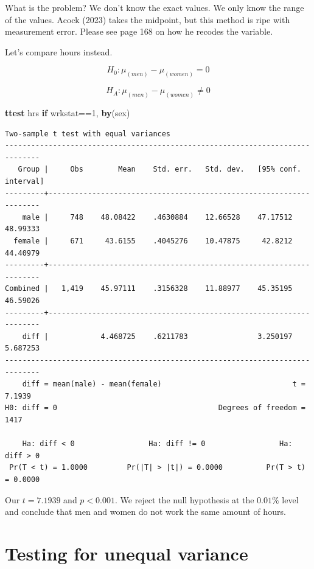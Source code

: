 \documentclass[
]{book}
\newenvironment{Shaded}{\begin{snugshade}}{\end{snugshade}}
\newcommand{\KeywordTok}[1]{\textcolor[rgb]{0.13,0.29,0.53}{\textbf{#1}}}
\newcommand{\NormalTok}[1]{#1}
\begin{document}
What is the problem? We don't know the exact values. We only know the range of the values. Acock (2023) takes the midpoint, but this method is ripe with measurement error. Please see page 168 on how he recodes the variable.

Let's compare hours instead.

\[ H_0: \mu_{(men)} - \mu_{(women)} = 0 \]

\[ H_A: \mu_{(men)} - \mu_{(women)} \neq 0 \]

\begin{Shaded}
\begin{Highlighting}[]
\KeywordTok{ttest}\NormalTok{ hrs }\KeywordTok{if}\NormalTok{ wrkstat==1, }\KeywordTok{by}\NormalTok{(sex)}
\end{Highlighting}
\end{Shaded}

\begin{verbatim}
Two-sample t test with equal variances
------------------------------------------------------------------------------
   Group |     Obs        Mean    Std. err.   Std. dev.   [95% conf. interval]
---------+--------------------------------------------------------------------
    male |     748    48.08422    .4630884    12.66528    47.17512    48.99333
  female |     671     43.6155    .4045276    10.47875     42.8212    44.40979
---------+--------------------------------------------------------------------
Combined |   1,419    45.97111    .3156328    11.88977    45.35195    46.59026
---------+--------------------------------------------------------------------
    diff |            4.468725    .6211783                3.250197    5.687253
------------------------------------------------------------------------------
    diff = mean(male) - mean(female)                              t =   7.1939
H0: diff = 0                                     Degrees of freedom =     1417

    Ha: diff < 0                 Ha: diff != 0                 Ha: diff > 0
 Pr(T < t) = 1.0000         Pr(|T| > |t|) = 0.0000          Pr(T > t) = 0.0000
\end{verbatim}

Our \(t=7.1939\) and \(p < 0.001\). We reject the null hypothesis at the \(0.01\%\) level and conclude that men and women do not work the same amount of hours.

\section{Testing for unequal variance}\label{testing-for-unequal-variance}
\end{document}
